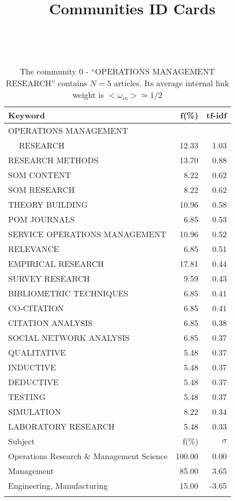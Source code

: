 \documentclass[a4paper,11pt]{report}
\title{{\bf Communities ID Cards}}
\date{\begin{flushleft}This document gather the ``ID Cards'' of the CC communities found within your database.\\
 The CC network was built by keeping a link between articles sharing at least 5 references. The communities characterized here correspond to the ones found in the level 0 (in the sense of the Louvain algo) which gathers more than 0 articles.\\
 These ID cards displays the most frequent keywords, subject categories, journals of publication, institution, countries, authors, references and reference journals of the articles of each community. The significance of an item $\sigma = \sqrt{N} (f - p) / \sqrt{p(1-p)}$ [where $N$ is the number of articles within the community and $f$ and $p$ are the proportion of articles respectively within the community and within the database displaying that item ] is also given (for example $\sigma > 5$ is really highly significant). The tf-idf value which can be calculated by $tf-idf = f*log(frac{1}{p})$ is also given.\\
\vspace{1cm}
\copyright Sebastian Grauwin, Liu Weizhi - (2014) \end{flushleft}}
\begin{document}
\begin{landscape}
\maketitle
\clearpage

\begin{table}[!ht]
\caption{The community 0 - ``OPERATIONS MANAGEMENT RESEARCH'' contains $N = 5$ articles. Its average internal link weight is $<\omega_{in}> \simeq 1/2$ }
\textcolor{white}{aa}\\
{\scriptsize\begin{tabular}{|l r  r|}
\hline
Keyword & f(\%) & tf-idf \\
\hline
OPERATIONS MANAGEMENT &  &\\
$\quad$ RESEARCH & 12.33 & 1.03\\
RESEARCH METHODS & 13.70 & 0.88\\
SOM CONTENT & 8.22 & 0.62\\
SOM RESEARCH & 8.22 & 0.62\\
THEORY BUILDING & 10.96 & 0.58\\
POM JOURNALS & 6.85 & 0.53\\
SERVICE OPERATIONS MANAGEMENT & 10.96 & 0.52\\
RELEVANCE & 6.85 & 0.51\\
EMPIRICAL RESEARCH & 17.81 & 0.44\\
SURVEY RESEARCH & 9.59 & 0.43\\
BIBLIOMETRIC TECHNIQUES & 6.85 & 0.41\\
CO-CITATION & 6.85 & 0.41\\
CITATION ANALYSIS & 6.85 & 0.38\\
SOCIAL NETWORK ANALYSIS & 6.85 & 0.37\\
QUALITATIVE & 5.48 & 0.37\\
INDUCTIVE & 5.48 & 0.37\\
DEDUCTIVE & 5.48 & 0.37\\
TESTING & 5.48 & 0.37\\
SIMULATION & 8.22 & 0.34\\
LABORATORY RESEARCH & 5.48 & 0.33\\
\hline
\hline
Subject & f(\%) & $\sigma$\\
\hline
Operations Research \& Management Science & 100.00 & 0.00\\
Management & 85.00 & 3.65\\
Engineering, Manufacturing & 15.00 & -3.65\\
 &  & \\

\end{tabular}}
\end{table}
\end{landscape}
\end{document}
